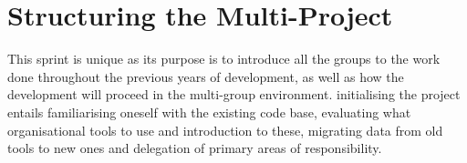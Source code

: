 \chapter{Structuring the Multi-Project}
This sprint is unique as its purpose is to introduce all the groups to the work done throughout the previous years of development, as well as how the development will proceed in the multi-group environment.
initialising the project entails familiarising oneself with the existing code base, evaluating what organisational tools to use and introduction to these, migrating data from old tools to new ones and delegation of primary areas of responsibility.